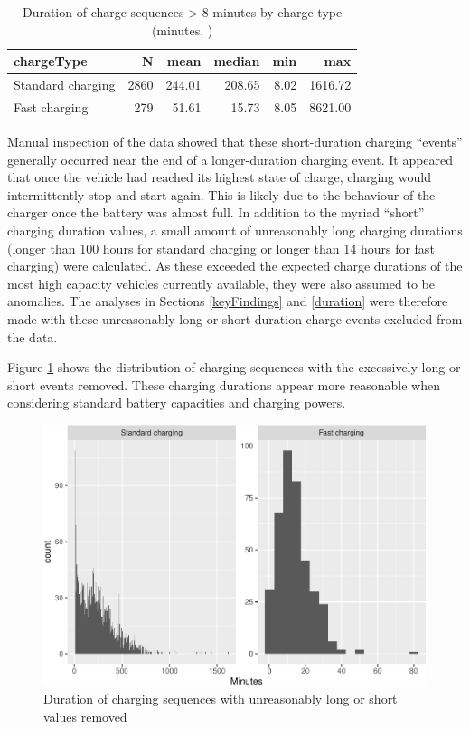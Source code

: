 \documentclass[]{article}
\begin{document}
\begin{table}[t]

\caption{\label{tab:durationDescTableReduced}Duration of charge sequences > 8 minutes by charge type (minutes, )}
\centering
\begin{tabular}{l|r|r|r|r|r}
\hline
chargeType & N & mean & median & min & max\\
\hline
Standard charging & 2860 & 244.01 & 208.65 & 8.02 & 1616.72\\
\hline
Fast charging & 279 & 51.61 & 15.73 & 8.05 & 8621.00\\
\hline
\end{tabular}
\end{table}

Manual inspection of the data showed that these short-duration charging
``events'' generally occurred near the end of a longer-duration charging
event. It appeared that once the vehicle had reached its highest state
of charge, charging would intermittently stop and start again. This is
likely due to the behaviour of the charger once the battery was almost
full. In addition to the myriad ``short'' charging duration values, a
small amount of unreasonably long charging durations (longer than 100
hours for standard charging or longer than 14 hours for fast charging)
were calculated. As these exceeded the expected charge durations of the
most high capacity vehicles currently available, they were also assumed
to be anomalies. The analyses in Sections \ref{keyFindings} and
\ref{duration} were therefore made with these unreasonably long or short
duration charge events excluded from the data.

Figure \ref{fig:longDuration} shows the distribution of charging
sequences with the excessively long or short events removed. These
charging durations appear more reasonable when considering standard
battery capacities and charging powers.

\begin{figure}
\centering
\includegraphics{EVBB_report_files/figure-latex/longDuration-1.pdf}
\caption{\label{fig:longDuration}Duration of charging sequences with
unreasonably long or short values removed}
\end{figure}
\end{document}
